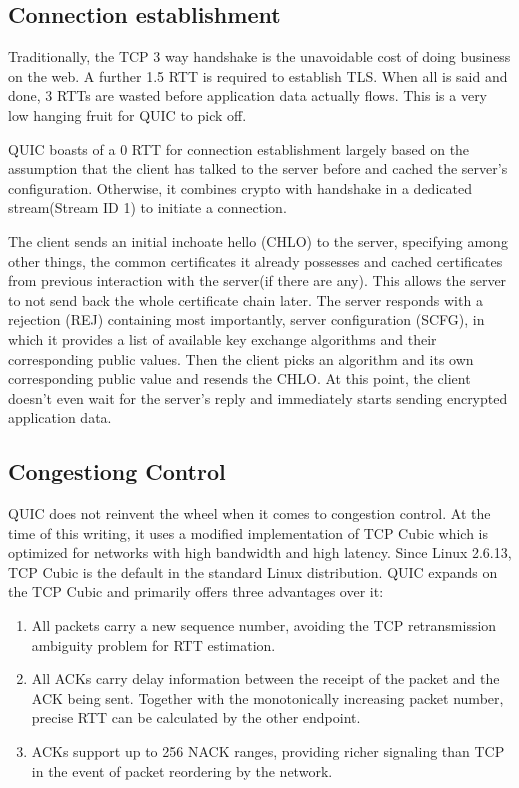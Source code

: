 \documentclass{sig-alternate-05-2015}
\begin{document}
\subsection{Connection establishment}
Traditionally, the TCP 3 way handshake is the unavoidable cost of doing business on the web. A further 1.5 RTT is required to establish TLS. When all is said and done, 3 RTTs are wasted before application data actually flows. This is a very low hanging fruit for QUIC to pick off. 

QUIC boasts of a 0 RTT for connection establishment largely based on the assumption that the client has talked to the server before and cached the server's configuration. Otherwise, it combines crypto with handshake in a dedicated stream(Stream ID 1) to initiate a connection.

The client sends an initial inchoate hello (CHLO) to the server, specifying among other things, the common certificates it already possesses and cached certificates from previous interaction with the server(if there are any). This allows the server to not send back the whole certificate chain later. The server responds with a rejection (REJ) containing most importantly, server configuration (SCFG), in which it provides a list of available key exchange algorithms and their corresponding public values. Then the client picks an algorithm and its own corresponding public value and resends the CHLO. At this point, the client doesn't even wait for the server's reply and immediately starts sending encrypted application data. \cite{quic:crypto}

\subsection{Congestiong Control}
QUIC does not reinvent the wheel when it comes to congestion control. At the time of this writing, it uses a modified implementation of TCP Cubic which is optimized for networks with high bandwidth and high latency. Since Linux 2.6.13, TCP Cubic is the default in the standard Linux distribution. QUIC expands on the TCP Cubic and primarily offers three advantages\cite{quic:draft} over it:

\begin{enumerate}
	\itemsep0em
	\item All packets carry a new sequence number, avoiding the TCP retransmission ambiguity problem for RTT estimation.
	\item All ACKs carry delay information between the receipt of the packet and the ACK being sent. Together with the monotonically increasing packet number, precise RTT can be calculated by the other endpoint.
	\item ACKs support up to 256 NACK ranges, providing richer signaling than TCP in the event of packet reordering by the network.
\end{enumerate}
\end{document}

